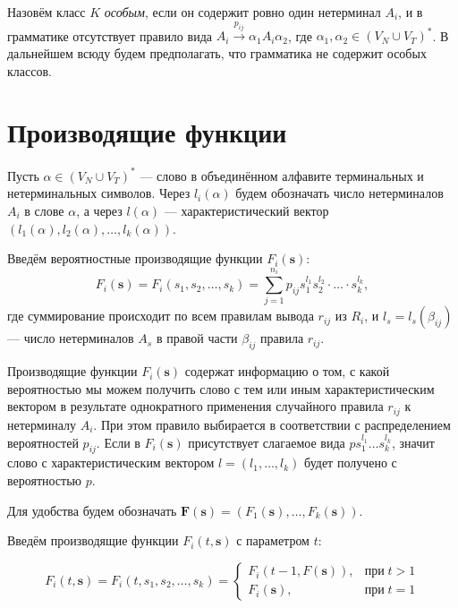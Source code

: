 \documentclass[12pt]{article}
\begin{document}
Назовём класс $K$ \textit{особым}, если он содержит ровно один нетерминал $A_i$, и в грамматике отсутствует правило вида $A_i \xrightarrow{p_{ij}} \alpha_1 A_i \alpha_2$, где $\alpha_1, \alpha_2 \in (V_N \cup V_T)^*$. В дальнейшем всюду будем предполагать, что грамматика не содержит особых классов.

\section{Производящие функции}

Пусть $\alpha \in (V_N \cup V_T)^*$ --- слово в объединённом алфавите терминальных и нетерминальных символов. Через $l_i(\alpha)$ будем обозначать число нетерминалов $A_i$ в слове $\alpha$, а через $l(\alpha)$ --- характеристический вектор $(l_1(\alpha), l_2(\alpha), \ldots, l_k(\alpha))$.

Введём вероятностные производящие функции $F_i(\textbf{s})$:
\begin{equation}
	 F_i(\textbf{s}) = F_i(s_1, s_2, \ldots, s_k) = \sum_{j = 1}^{n_i} p_{ij} s_1^{l_1} s_2^{l_2} \cdot \ldots \cdot s_k^{l_k},
\end{equation}
где суммирование происходит по всем правилам вывода $r_{ij}$ из $R_i$, и $l_s = l_s(\beta_{ij})$ --- число нетерминалов $A_s$ в правой части $\beta_{ij}$ правила $r_{ij}$.

\hrulefill

\begin{footnotesize}
Производящие функции $F_i(\textbf{s})$ содержат информацию о том, с какой вероятностью мы можем получить слово с тем или иным характеристическим вектором в результате однократного применения случайного правила $r_{ij}$ к нетерминалу $A_i$. При этом правило выбирается в соответствии с распределением вероятностей $p_{ij}$. Если в $F_i(\textbf{s})$ присутствует слагаемое вида $p s_1^{l_1} \ldots s_k^{l_k}$, значит слово с характеристическим вектором $l = (l_1, \ldots, l_k)$ будет получено с вероятностью $p$.
\end{footnotesize}

\hrulefill

Для удобства будем обозначать $\textbf{F}(\textbf{s}) = (F_1(\textbf{s}), \ldots, F_k(\textbf{s}))$.

Введём производящие функции $F_i(t, \textbf{s})$ с параметром $t$:

\begin{equation}
	F_i(t, \textbf{s}) = F_i(t, s_1, s_2, \ldots, s_k) = \left\{
	\begin{array}{ll}
		F_i(t-1, F(\textbf{s})), & \text{при}\; t > 1 \\
		F_i(\textbf{s}), & \text{при}\; t = 1
	\end{array}
	\right.
\end{equation}
\end{document}
